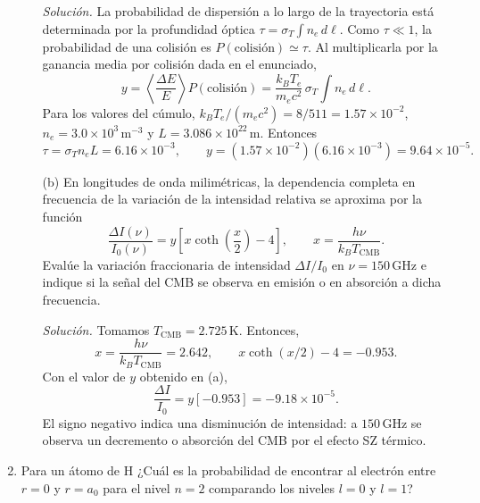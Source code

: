 \documentclass[11pt]{article}
\begin{document}
\begin{enumerate}
\begin{enumerate}
        \textit{Solución.} La probabilidad de dispersión a lo largo de la trayectoria está determinada por la profundidad óptica $\tau=\sigma_T\int n_e\,d\ell$. Como $\tau\ll1$, la probabilidad de una colisión es $P(\text{colisión})\simeq\tau$. Al multiplicarla por la ganancia media por colisión dada en el enunciado,
        \[
            y=\left\langle\frac{\Delta E}{E}\right\rangle P(\text{colisión})
            =\frac{k_BT_e}{m_ec^2}\,\sigma_T\int n_e\,d\ell.
        \]
        Para los valores del cúmulo, $k_BT_e/(m_ec^2)=8/511=1.57\times10^{-2}$, $n_e=3.0\times10^3\,\mathrm{m}^{-3}$ y $L=3.086\times10^{22}\,\mathrm{m}$. Entonces
        \[
            \tau=\sigma_T n_eL=6.16\times10^{-3},
            \qquad y=(1.57\times10^{-2})(6.16\times10^{-3})
            =9.64\times10^{-5}.
        \]
        \parencite[Sec. 16.2.2, pp. 532--533]{chaparro2026}

        \item[(b)] En longitudes de onda milimétricas, la dependencia completa en frecuencia de la variación de la intensidad relativa se aproxima por la función
        \[
            \frac{\Delta I(\nu)}{I_0(\nu)} = y\left[x\coth\left(\frac{x}{2}\right)-4\right],
            \qquad
            x = \frac{h\nu}{k_B T_{\mathrm{CMB}}}.
        \]
        Evalúe la variación fraccionaria de intensidad $\Delta I/I_0$ en $\nu = 150\,\mathrm{GHz}$ e indique si la señal del CMB se observa en emisión o en absorción a dicha frecuencia.

        \textit{Solución.} Tomamos $T_{\mathrm{CMB}}=2.725\,\mathrm{K}$. Entonces,
        \[
            x=\frac{h\nu}{k_BT_{\mathrm{CMB}}}=2.642,
            \qquad x\coth(x/2)-4=-0.953.
        \]
        Con el valor de $y$ obtenido en (a),
        \[
            \frac{\Delta I}{I_0}=y[-0.953]=-9.18\times10^{-5}.
        \]
        El signo negativo indica una disminución de intensidad: a $150\,\mathrm{GHz}$ se observa un decremento o absorción del CMB por el efecto SZ térmico. \parencite[Sec. 16.2.2, pp. 532--533]{chaparro2026}
        
    \end{enumerate}

    \item Para un átomo de H ¿Cuál es la probabilidad de encontrar al electrón entre $r = 0$ y $r = a_0$ para el nivel $n = 2$ comparando los niveles $l = 0$ y $l = 1$?


\end{enumerate}
\end{document}
